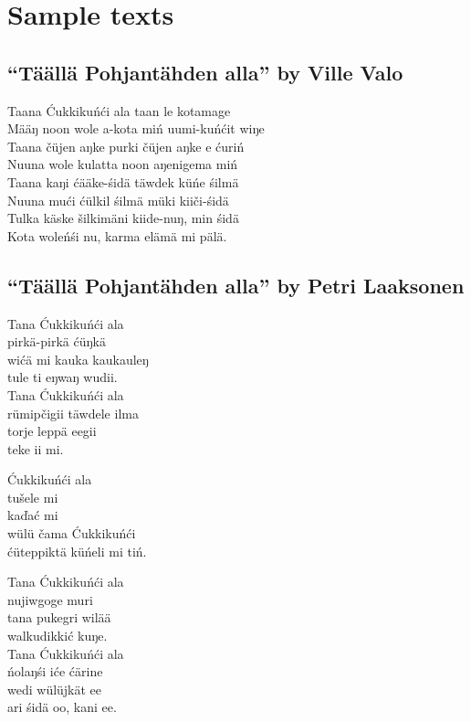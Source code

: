 \chapter{Sample texts}
\section{``T\"a\"all\"a Pohjant\"ahden alla'' by Ville Valo}
Taana \'Cukkiku\'n\'ci ala taan le kotamage \\
M\"a\"aŋ noon wole a-kota mi\'n uumi-ku\'n\'cit wiŋe \\[0.5em]
Taana \v{c}\"ujen aŋke purki \v{c}\"ujen aŋke e \'curi\'n \\
Nuuna wole kulatta noon aŋenigema mi\'n \vspace{0.5em} \\[0.5em]
Taana kaŋi \'c\"a\"ake-\'sid\"a t\"awdek k\"u\'ne \'silm\"a \\
Nuuna mu\'ci \'c\"ulkil \'silm\"a m\"uki kii\v{c}i-\'sid\"a \\[0.5em]
Tulka k\"aske \v{s}ilkim\"ani kiide-nuŋ, min \'sid\"a \\
Kota wole\'n\'si nu, karma el\"am\"a mi p\"al\"a.


\section{``T\"a\"all\"a Pohjant\"ahden alla'' by Petri Laaksonen}
Tana \'Cukkiku\'n\'ci ala \\
pirk\"a-pirk\"a \'c\"uŋk\"a \\
wi\'c\"a mi kauka kaukauleŋ \\
tule ti eŋwaŋ wudii. \\
Tana \'Cukkiku\'n\'ci ala \\
r\"umip\v{c}igii t\"awdele ilma \\
torje lepp\"a eegii \\
teke ii mi. \vspace{0.5em}

\noindent \'Cukkiku\'n\'ci ala \\
tu\v{s}ele mi \\
ka\v{d}a\'c mi \\
w\"ul\"u \v{c}ama \'Cukkiku\'n\'ci \\
\'c\"uteppikt\"a k\"u\'neli mi ti\'n. \vspace{0.5em}

\noindent Tana \'Cukkiku\'n\'ci ala \\
nujiwgoge muri \\
tana pukegri wil\"a\"a \\
walkudikki\'c kuŋe. \\
Tana \'Cukkiku\'n\'ci ala \\
\'nolaŋ\'si i\'ce \'c\"arine \\
wedi w\"ul\"ujk\"at ee \\
ari \'sid\"a oo, kani ee.


